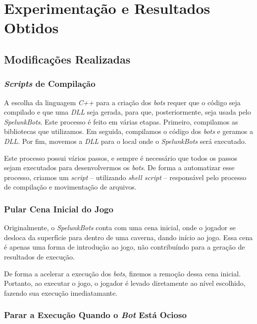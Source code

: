 \chapter{\label{chap:experimentation-and-results}Experimentação e Resultados Obtidos}


\section{\label{section:modifications}Modificações Realizadas}

\subsection{\textit{Scripts} de Compilação}

A escolha da linguagem \textit{C++} para a criação dos \textit{bots} requer que
o código seja compilado e que uma \textit{DLL} seja gerada, para que,
posteriormente, seja usada pelo \textit{SpelunkBots}. Este processo é feito em
várias etapas.  Primeiro, compilamos as bibliotecas que utilizamos. Em seguida,
compilamos o código dos \textit{bots} e geramos a \textit{DLL}. Por fim,
movemos a \textit{DLL} para o local onde o \textit{SpelunkBots} será executado.

Este processo possui vários passos, e sempre é necessário que todos os passos
sejam executados para desenvolvermos os \textit{bots}. De forma a automatizar
esse processo, criamos um \textit{script} -- utilizando \textit{shell script}
-- responsável pelo processo de compilação e movimentação de arquivos.

\subsection{Pular Cena Inicial do Jogo}

Originalmente, o \textit{SpelunkBots} conta com uma cena inicial, onde o
jogador se desloca da superfície para dentro de uma caverna, dando início ao
jogo. Essa cena é apenas uma forma de introdução ao jogo, não contribuíndo para
a geração de resultados de execução.

De forma a acelerar a execução dos \textit{bots}, fizemos a remoção dessa cena
inicial. Portanto, ao executar o jogo, o jogador é levado diretamente ao nível
escolhido, fazendo sua execução imediatamante.

\subsection{Parar a Execução Quando o \textit{Bot} Está Ocioso}

